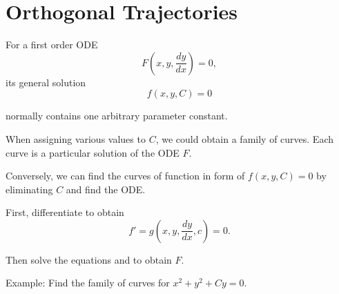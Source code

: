 \documentclass[12pt,letterpaper]{article}
\begin{document}
\section*{Orthogonal Trajectories}
For a first order ODE
\[
  F(x,y,\frac{dy}{dx})=0,
\]
its general solution
\begin{equation}\label{eq:ge}
   f(x,y,C)=0
\end{equation}

normally contains one arbitrary parameter constant.

When assigning various values to $C$, we could obtain a family of curves.
Each curve is a particular solution of the ODE $F$.

Conversely, we can find the curves of function in form of $ f(x,y,C)=0$ by eliminating $C$
and find the ODE.

First, differentiate  to obtain
\begin{equation}\label{eq:diff}
  f'=g(x,y,\frac{dy}{dx},c)=0.
\end{equation}

Then solve the equations  and  to obtain $F$.

Example: Find the family of curves for $x^2+y^2+Cy=0$.
\end{document}
